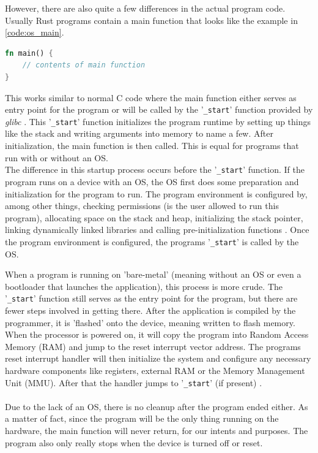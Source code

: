 However, there are also quite a few differences in the actual program code.
Usually Rust programs contain a main function that looks like the example in \ref{code:os_main}.
\begin{lstlisting}[style=colorEX,language=Rust,caption={Standard main function in Rust},label={code:os_main}]
fn main() {
    // contents of main function
}
\end{lstlisting}
This works similar to normal C code where the main function either serves as entry point for the program or will be called by the '\lstinline{_start}' function provided by \emph{glibc} \cite{before_main}.
This '\lstinline{_start}' function initializes the program runtime by setting up things like the stack and writing arguments into memory to name a few.
After initialization, the main function is then called.
This is equal for programs that run with or without an OS.\\
The difference in this startup process occurs before the '\lstinline{_start}' function.
If the program runs on a device with an OS, the OS first does some preparation and initialization for the program to run.
The program environment is configured by, among other things, checking permissions (is the user allowed to run this program),
allocating space on the stack and heap, initializing the stack pointer, linking dynamically linked libraries and calling pre-initialization functions \cite{before_main}.
Once the program environment is configured, the programs '\lstinline{_start}' is called by the OS.


When a program is running on 'bare-metal' (meaning without an OS or even a bootloader that launches the  application), this process is more crude.
The '\lstinline{_start}' function still serves as the entry point for the program, but there are fewer steps involved in getting there.
After the application is compiled by the programmer, it is 'flashed' onto the device, meaning written to flash memory.
When the processor is powered on, it will copy the program into Random Access Memory (RAM) and jump to the reset interrupt vector address.
The programs reset interrupt handler will then initialize the system and configure any necessary hardware components
like registers, external RAM or the Memory Management Unit (MMU).
After that the handler jumps to '\lstinline{_start}' (if present) \cite{before_main}.\\\\
Due to the lack of an OS, there is no cleanup after the program ended either.
As a matter of fact, since the program will be the only thing running on the hardware,
the main function will never return, for our intents and purposes.
The program also only really stops when the device is turned off or reset.

